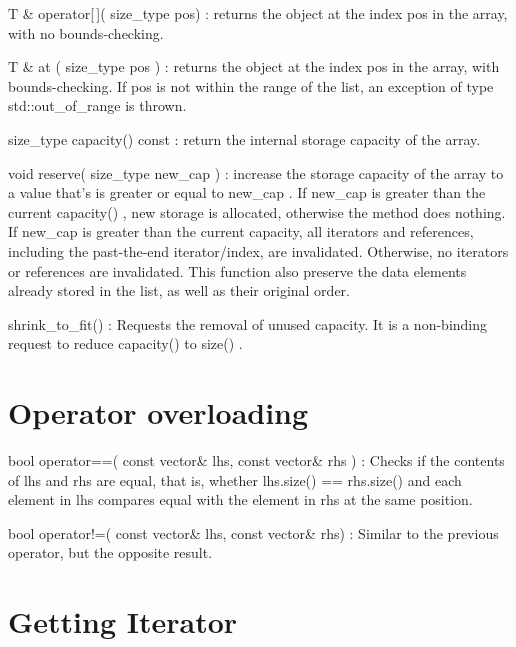 \begin{DoxyItemize}
\item {\ttfamily T \& operator\mbox{[}$\,$\mbox{]}( size\+\_\+type pos)} \+: returns the object at the index pos in the array, with no bounds-\/checking.
\item {\ttfamily T \& at ( size\+\_\+type pos )} \+: returns the object at the index pos in the array, with bounds-\/checking. If pos is not within the range of the list, an exception of type {\ttfamily std\+::out\+\_\+of\+\_\+range} is thrown.
\item {\ttfamily size\+\_\+type capacity() const} \+: return the internal storage capacity of the array.
\item {\ttfamily void reserve( size\+\_\+type new\+\_\+cap )} \+: increase the storage capacity of the array to a value that’s is greater or equal to {\ttfamily new\+\_\+cap} . If {\ttfamily new\+\_\+cap} is greater than the current {\ttfamily capacity()} , new storage is allocated, otherwise the method does nothing. If new\+\_\+cap is greater than the current capacity, all iterators and references, including the past-\/the-\/end {\ttfamily iterator/index}, are invalidated. Otherwise, no iterators or references are invalidated. This function also preserve the data elements already stored in the list, as well as their original order.
\item {\ttfamily shrink\+\_\+to\+\_\+fit()} \+: Requests the removal of unused capacity. It is a non-\/binding request to reduce capacity() to size() .
\end{DoxyItemize}

\section*{Operator overloading}


\begin{DoxyItemize}
\item {\ttfamily bool operator==( const vector\& lhs, const vector\& rhs )} \+: Checks if the contents of lhs and rhs are equal, that is, whether {\ttfamily lhs.\+size() == rhs.\+size()} and each element in lhs compares equal with the element in {\ttfamily rhs} at the same position.
\item {\ttfamily bool operator!=( const vector\& lhs, const vector\& rhs)} \+: Similar to the previous operator, but the opposite result.
\end{DoxyItemize}

\section*{Getting Iterator}


